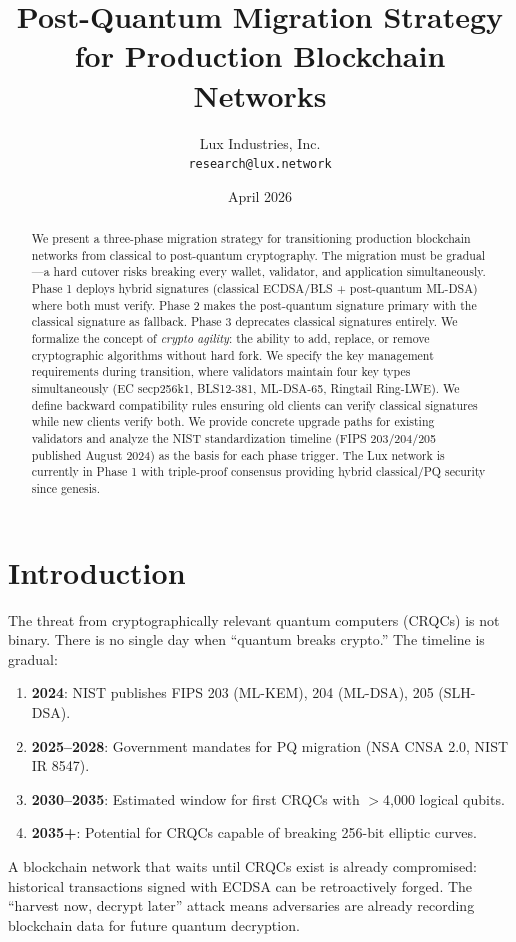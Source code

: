 \documentclass[11pt,a4paper]{article}
\title{Post-Quantum Migration Strategy\\for Production Blockchain Networks}
\author{
Lux Industries, Inc.\\
\texttt{research@lux.network}
}
\date{April 2026}
\begin{document}
\luxcoverpage

\begin{abstract}
We present a three-phase migration strategy for transitioning production blockchain networks from classical to post-quantum cryptography. The migration must be gradual---a hard cutover risks breaking every wallet, validator, and application simultaneously. Phase 1 deploys hybrid signatures (classical ECDSA/BLS + post-quantum ML-DSA) where both must verify. Phase 2 makes the post-quantum signature primary with the classical signature as fallback. Phase 3 deprecates classical signatures entirely. We formalize the concept of \emph{crypto agility}: the ability to add, replace, or remove cryptographic algorithms without hard fork. We specify the key management requirements during transition, where validators maintain four key types simultaneously (EC secp256k1, BLS12-381, ML-DSA-65, Ringtail Ring-LWE). We define backward compatibility rules ensuring old clients can verify classical signatures while new clients verify both. We provide concrete upgrade paths for existing validators and analyze the NIST standardization timeline (FIPS 203/204/205 published August 2024) as the basis for each phase trigger. The Lux network is currently in Phase 1 with triple-proof consensus providing hybrid classical/PQ security since genesis.
\end{abstract}

\section{Introduction}

The threat from cryptographically relevant quantum computers (CRQCs) is not binary. There is no single day when ``quantum breaks crypto.'' The timeline is gradual:

\begin{enumerate}[leftmargin=2em]
\item \textbf{2024}: NIST publishes FIPS 203 (ML-KEM), 204 (ML-DSA), 205 (SLH-DSA).
\item \textbf{2025--2028}: Government mandates for PQ migration (NSA CNSA 2.0, NIST IR 8547).
\item \textbf{2030--2035}: Estimated window for first CRQCs with $>$4,000 logical qubits.
\item \textbf{2035+}: Potential for CRQCs capable of breaking 256-bit elliptic curves.
\end{enumerate}

A blockchain network that waits until CRQCs exist is already compromised: historical transactions signed with ECDSA can be retroactively forged. The ``harvest now, decrypt later'' attack means adversaries are already recording blockchain data for future quantum decryption.
\end{document}
